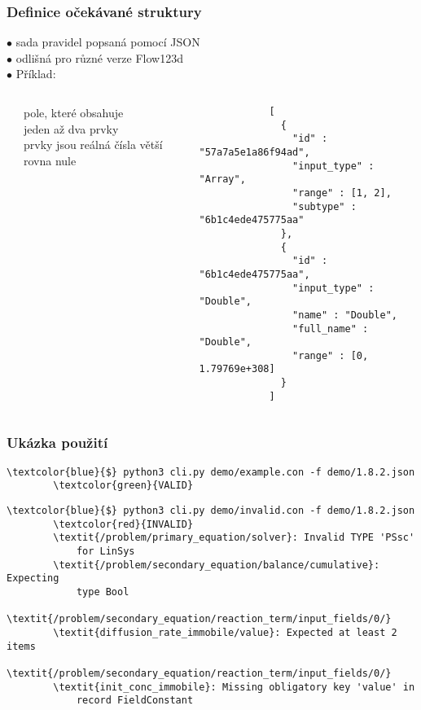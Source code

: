\documentclass{beamer}
\begin{document}
\begin{frame}[fragile]
	\frametitle{Definice očekávané struktury}
	$\bullet$ sada pravidel popsaná pomocí JSON \\
	$\bullet$ odlišná pro různé verze Flow123d \\
	$\bullet$ Příklad: \\
	\begin{columns}[c]
		\begin{column}{0.05\textwidth}
		\end{column}
		\begin{column}{0.35\textwidth}
			pole, které obsahuje \\jeden až dva prvky \\
			\vspace{1.6cm}
			prvky jsou reálná čísla větší rovna nule
		\end{column}
		\begin{column}{0.6\textwidth}
			\footnotesize\begin{verbatim}
			[
			  {
			    "id" : "57a7a5e1a86f94ad",
			    "input_type" : "Array",
			    "range" : [1, 2],
			    "subtype" : "6b1c4ede475775aa"
			  },
			  {
			    "id" : "6b1c4ede475775aa",
			    "input_type" : "Double",
			    "name" : "Double",
			    "full_name" : "Double",
			    "range" : [0, 1.79769e+308]
			  }
			]
			\end{verbatim}
		\end{column}
	\end{columns}
	
\end{frame}

\begin{frame}[fragile]
	\frametitle{Ukázka použití}

	\noindent
	\footnotesize\begin{Verbatim}[commandchars=\\\{\}]
		\textcolor{blue}{$} python3 cli.py demo/example.con -f demo/1.8.2.json
		\textcolor{green}{VALID}
	\end{Verbatim}
	\pause
	\footnotesize\begin{Verbatim}[commandchars=\\\{\}]
		\textcolor{blue}{$} python3 cli.py demo/invalid.con -f demo/1.8.2.json
		\textcolor{red}{INVALID}
		\textit{/problem/primary_equation/solver}: Invalid TYPE 'PSsc' 
		    for LinSys
		\textit{/problem/secondary_equation/balance/cumulative}: Expecting 
		    type Bool
		\textit{/problem/secondary_equation/reaction_term/input_fields/0/}
		\textit{diffusion_rate_immobile/value}: Expected at least 2 items
		\textit{/problem/secondary_equation/reaction_term/input_fields/0/}
		\textit{init_conc_immobile}: Missing obligatory key 'value' in
		    record FieldConstant
	\end{Verbatim}
	\normalsize
\end{frame}
\end{document}
